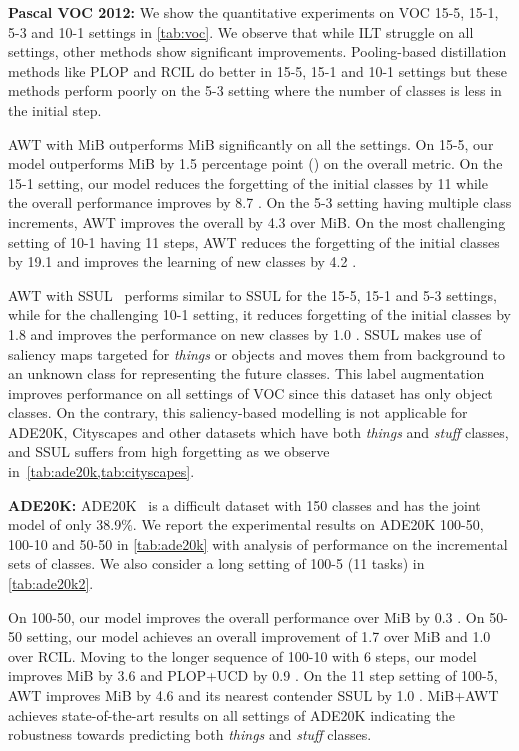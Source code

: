 \noindent\textbf{Pascal VOC 2012:} We show the quantitative experiments on VOC 15-5, 15-1, 5-3 and 10-1 settings in \cref{tab:voc}. We observe that while ILT struggle on all settings, other methods show significant improvements. Pooling-based distillation methods like PLOP and RCIL do better in 15-5, 15-1 and 10-1 settings but these methods perform poorly on the 5-3 setting where the number of classes is less in the initial step.

AWT with MiB outperforms MiB significantly on all the settings. On 15-5, our model outperforms MiB by 1.5 percentage point () on the overall \miou{} metric. On the 15-1 setting, our model reduces the forgetting of the initial classes by 11  while the overall performance improves by 8.7 . On the 5-3 setting having multiple class increments, AWT improves the overall \miou{} by 4.3  over MiB. On the most challenging setting of 10-1 having 11 steps, AWT reduces the forgetting of the initial classes by 19.1  and improves the learning of new classes by 4.2 . 

AWT with SSUL~\cite{cha2021ssul} performs similar to SSUL for the 15-5, 15-1 and 5-3 settings, while for the challenging 10-1 setting, it reduces forgetting of the initial classes by 1.8  and improves the performance on new classes by 1.0 . SSUL makes use of saliency maps targeted for \emph{things} or objects and moves them from background to an unknown class for representing the future classes. This label augmentation improves performance on all settings of VOC since this dataset has only object classes. On the contrary, this saliency-based modelling is not applicable for ADE20K, Cityscapes and other datasets which have both \emph{things} and \emph{stuff} classes, and SSUL suffers from high forgetting as we observe in~\cref{tab:ade20k,tab:cityscapes}.


\noindent\textbf{ADE20K:} ADE20K~\cite{zhou2017scene} is a difficult dataset with 150 classes and has the joint model \miou{} of only 38.9\%. We report the experimental results on ADE20K 100-50, 100-10 and 50-50 in \cref{tab:ade20k} with analysis of performance on the incremental sets of classes. We also consider a long setting of 100-5 (11 tasks) in \cref{tab:ade20k2}. 



On 100-50, our model improves the overall performance over MiB by 0.3 .
On 50-50 setting, our model achieves an overall improvement of 1.7  over MiB and 1.0  over RCIL. Moving to the longer sequence of 100-10 with 6 steps, our model improves MiB by 3.6  and PLOP+UCD by 0.9 . On the 11 step setting of 100-5, AWT improves MiB by 4.6  and its nearest contender SSUL by 1.0 . MiB+AWT achieves state-of-the-art results on all settings of ADE20K indicating the robustness towards predicting both \emph{things} and \emph{stuff} classes.

